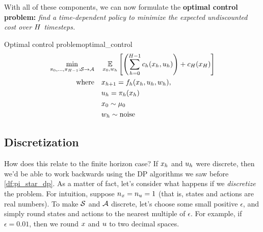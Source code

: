 \documentclass[../main/main]{subfiles}
\begin{document}
With all of these components, we can now formulate the \textbf{optimal control problem:} \emph{find a time-dependent policy to minimize the expected undiscounted cost over $\hor$ timesteps.}

\begin{definition}{Optimal control problem}{optimal_control}
    \begin{equation}
        \begin{split}
            \min_{\pi_0, \dots, \pi_{\hor-1} : \S \to \A} \quad & \E_{\st_0, w_\hi} \left[
                \left( \sum_{\hi=0}^{\hor-1} c_\hi(\st_\hi, \act_\hi) \right) + c_\hor(\st_\hor)
            \right] \\
            \text{where} \quad & \st_{\hi+1} = f_\hi(\st_\hi, \act_\hi, w_\hi), \\
            & \act_\hi = \pi_\hi(\st_\hi) \\
            & \st_0 \sim \mu_0 \\
            & w_\hi \sim \text{noise}
        \end{split}
    \end{equation}
\end{definition}


\subsection{Discretization}

How does this relate to the finite horizon case?
If $\st_\hi$ and $\act_\hi$ were discrete, then we'd be able to work backwards using
the DP algorithms we saw before \eqref{df:pi_star_dp}.
As a matter of fact, let's consider what happens if we \emph{discretize} the
problem. For intuition, suppose $n_\st = n_\act = 1$ (that is, states and actions are real numbers).
To make $\S$ and $\A$ discrete, let's choose some small positive $\epsilon$,
and simply round states and actions to the nearest multiple of
$\epsilon$. For example, if $\epsilon = 0.01$, then we round $\st$ and $\act$ to two decimal spaces.
\end{document}
